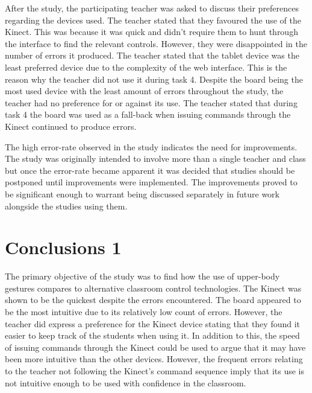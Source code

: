 \documentclass[manuscript, review, screen]{acmart}
\begin{document}
After the study, the participating teacher was asked to discuss their preferences regarding the devices used.
The teacher stated that they favoured the use of the Kinect.
This was because it was quick and didn't require them to hunt through the interface to find the relevant controls.
However, they were disappointed in the number of errors it produced.
The teacher stated that the tablet device was the least preferred device due to the complexity of the web interface.
This is the reason why the teacher did not use it during task 4.
Despite the board being the most used device with the least amount of errors throughout the study, the teacher had no preference for or against its use.
The teacher stated that during task 4 the board was used as a fall-back when issuing commands through the Kinect continued to produce errors.

The high error-rate observed in the study indicates the need for improvements.
The study was originally intended to involve more than a single teacher and class but once the error-rate became apparent it was decided that studies should be postponed until improvements were implemented.
The improvements proved to be significant enough to warrant being discussed separately in future work alongside the studies using them.


\section{Conclusions 1}
\label{sec:conclusions1}




The primary objective of the study was to find how the use of upper-body gestures compares to alternative classroom control technologies.
The Kinect was shown to be the quickest despite the errors encountered.
The board appeared to be the most intuitive due to its relatively low count of errors.
However, the teacher did express a preference for the Kinect device stating that they found it easier to keep track of the students when using it.
In addition to this, the speed of issuing commands through the Kinect could be used to argue that it may have been more intuitive than the other devices.
However, the frequent errors relating to the teacher not following the Kinect's command sequence imply that its use is not intuitive enough to be used with confidence in the classroom.
\end{document}
